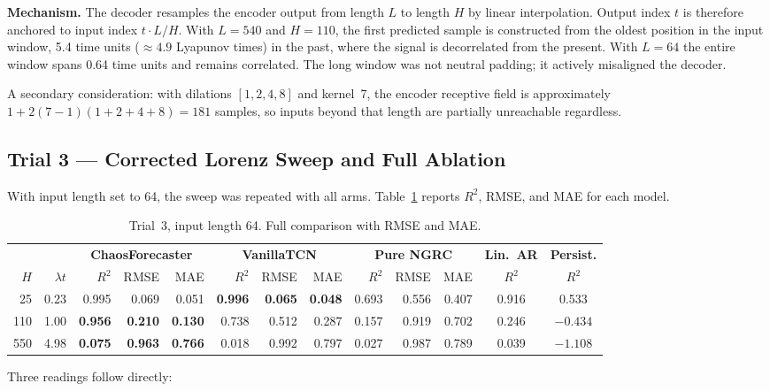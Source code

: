\documentclass[11pt,a4paper]{article}
\begin{document}
\textbf{Mechanism.}
The decoder resamples the encoder output from length $L$ to length $H$ by linear interpolation.
Output index $t$ is therefore anchored to input index $t \cdot L/H$.
With $L = 540$ and $H = 110$, the first predicted sample is constructed from the oldest position in the input window, 5.4 time units ($\approx 4.9$ Lyapunov times) in the past, where the signal is decorrelated from the present.
With $L = 64$ the entire window spans 0.64 time units and remains correlated.
The long window was not neutral padding; it actively misaligned the decoder.

A secondary consideration: with dilations $[1, 2, 4, 8]$ and kernel~7, the encoder receptive field is approximately $1 + 2(7-1)(1+2+4+8) = 181$ samples, so inputs beyond that length are partially unreachable regardless.


\subsection{Trial 3 --- Corrected Lorenz Sweep and Full Ablation}

With input length set to 64, the sweep was repeated with all arms.
Table~\ref{tab:trial3} reports $R^2$, RMSE, and MAE for each model.

\begin{table}[H]
\centering
\caption{Trial~3, input length 64. Full comparison with RMSE and MAE.}
\label{tab:trial3}
\begin{tabular}{rr|rrr|rrr|rrr|c|c}
\toprule
 & & \multicolumn{3}{c|}{\textbf{ChaosForecaster}} & \multicolumn{3}{c|}{\textbf{VanillaTCN}} & \multicolumn{3}{c|}{\textbf{Pure NGRC}} & \textbf{Lin.\ AR} & \textbf{Persist.} \\
$H$ & $\lambda t$ & $R^2$ & RMSE & MAE & $R^2$ & RMSE & MAE & $R^2$ & RMSE & MAE & $R^2$ & $R^2$ \\
\midrule
25  & 0.23 & 0.995 & 0.069 & 0.051 & \textbf{0.996} & \textbf{0.065} & \textbf{0.048} & 0.693 & 0.556 & 0.407 & 0.916 & 0.533 \\
110 & 1.00 & \textbf{0.956} & \textbf{0.210} & \textbf{0.130} & 0.738 & 0.512 & 0.287 & 0.157 & 0.919 & 0.702 & 0.246 & $-0.434$ \\
550 & 4.98 & \textbf{0.075} & \textbf{0.963} & \textbf{0.766} & 0.018 & 0.992 & 0.797 & 0.027 & 0.987 & 0.789 & 0.039 & $-1.108$ \\
\bottomrule
\end{tabular}
\end{table}

Three readings follow directly:
\end{document}
